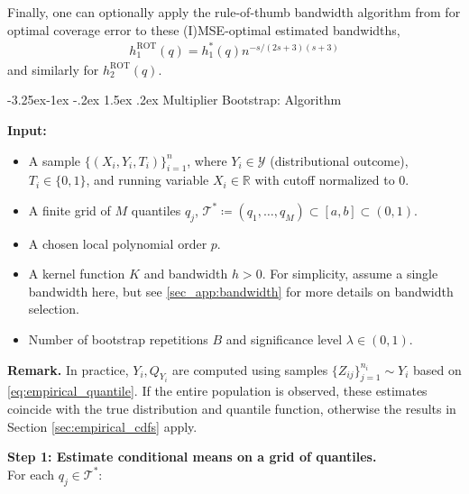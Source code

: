 \documentclass[12pt]{article}
\makeatletter
\renewcommand\subsection{\@startsection{subsection}{2}{\z@}%
  {-3.25ex\@plus -1ex \@minus -.2ex}%
  {1.5ex \@plus .2ex}%
  {\itshape\large\center}} %
\makeatother
\begin{document}
Finally, one can optionally apply the rule-of-thumb bandwidth algorithm from \citet{calonico2018effect, calonico2020optimal} for optimal coverage error to these (I)MSE-optimal estimated bandwidths,
\begin{align*}
h^{\mathrm{ROT}}_1(q) = h_1^*(q) n^{-s/(2s+3)(s+3)}
\end{align*}
and similarly for $h^{\mathrm{ROT}}_2(q)$.

\subsection{Multiplier Bootstrap: Algorithm} \label{app:bootstrap}

\noindent\textbf{Input:}
\begin{itemize}
\item A sample $\{(X_i, Y_i, T_i)\}_{i=1}^n$, where $Y_i \in \mathcal{Y}$ (distributional outcome), $T_i \in \{0,1\}$, and running variable $X_i \in \mathbb{R}$ with cutoff normalized to $0$.
\item A finite grid of $M$ quantiles $q_j$,  $\mathcal{T}^{*} \coloneqq (q_1, \ldots, q_M) \subset [a,b] \subset (0,1)$.
\item A chosen local polynomial order $p$.
\item A kernel function $K$ and bandwidth $h>0$. For simplicity, assume a single bandwidth here, but see \ref{sec_app:bandwidth} for more details on bandwidth selection. 
\item Number of bootstrap repetitions $B$ and significance level $\lambda\in (0,1)$.
\end{itemize}

\noindent\textbf{Remark.} In practice, $Y_i, Q_{Y_i}$ are computed using samples $\{ Z_{ij} \}_{j=1}^{n_i} \sim Y_i$ based on \eqref{eq:empirical_quantile}. If the entire population is observed, these estimates coincide with the true distribution and quantile function, otherwise the results in Section \ref{sec:empirical_cdfs} apply. 

\medskip

\noindent\textbf{Step 1: Estimate conditional means on a grid of quantiles.} \\
For each $q_j \in \mathcal{T}^{*}$:
\end{document}
